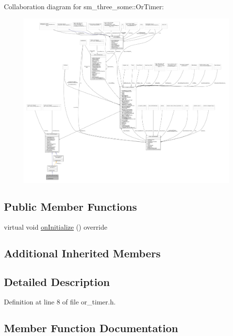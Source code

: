 Collaboration diagram for sm\+\_\+three\+\_\+some\+:\+:Or\+Timer\+:
\nopagebreak
\begin{figure}[H]
\begin{center}
\leavevmode
\includegraphics[width=350pt]{classsm__three__some_1_1OrTimer__coll__graph}
\end{center}
\end{figure}
\subsection*{Public Member Functions}
\begin{DoxyCompactItemize}
\item 
virtual void \hyperlink{classsm__three__some_1_1OrTimer_a756a41ced34733951def1d2aac8a1bb1}{on\+Initialize} () override
\end{DoxyCompactItemize}
\subsection*{Additional Inherited Members}


\subsection{Detailed Description}


Definition at line 8 of file or\+\_\+timer.\+h.



\subsection{Member Function Documentation}
\mbox{\label{classsm__three__some_1_1OrTimer_a756a41ced34733951def1d2aac8a1bb1}} 
